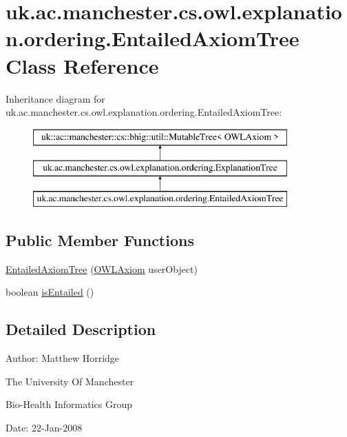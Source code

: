 \hypertarget{classuk_1_1ac_1_1manchester_1_1cs_1_1owl_1_1explanation_1_1ordering_1_1_entailed_axiom_tree}{\section{uk.\-ac.\-manchester.\-cs.\-owl.\-explanation.\-ordering.\-Entailed\-Axiom\-Tree Class Reference}
\label{classuk_1_1ac_1_1manchester_1_1cs_1_1owl_1_1explanation_1_1ordering_1_1_entailed_axiom_tree}
}
Inheritance diagram for uk.\-ac.\-manchester.\-cs.\-owl.\-explanation.\-ordering.\-Entailed\-Axiom\-Tree\-:\begin{figure}[H]
\begin{center}
\leavevmode
\includegraphics[height=3.000000cm]{classuk_1_1ac_1_1manchester_1_1cs_1_1owl_1_1explanation_1_1ordering_1_1_entailed_axiom_tree}
\end{center}
\end{figure}
\subsection*{Public Member Functions}
\begin{DoxyCompactItemize}
\item 
\hyperlink{classuk_1_1ac_1_1manchester_1_1cs_1_1owl_1_1explanation_1_1ordering_1_1_entailed_axiom_tree_af8d8673d652c204dce1ef7648a5a64b9}{Entailed\-Axiom\-Tree} (\hyperlink{interfaceorg_1_1semanticweb_1_1owlapi_1_1model_1_1_o_w_l_axiom}{O\-W\-L\-Axiom} user\-Object)
\item 
boolean \hyperlink{classuk_1_1ac_1_1manchester_1_1cs_1_1owl_1_1explanation_1_1ordering_1_1_entailed_axiom_tree_a98433b6d333a8bcf40bb53008694818d}{is\-Entailed} ()
\end{DoxyCompactItemize}


\subsection{Detailed Description}
Author\-: Matthew Horridge\par
 The University Of Manchester\par
 Bio-\/\-Health Informatics Group\par
 Date\-: 22-\/\-Jan-\/2008\par
\par
 

